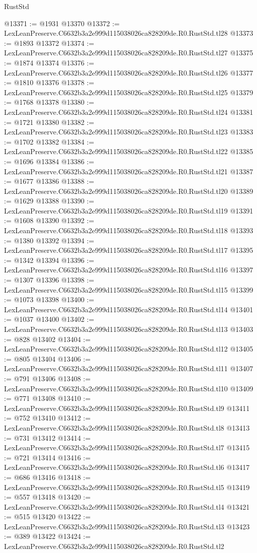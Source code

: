\begin{lexlean}{RustStd}
\begin{coremodule}
@13371 := @1931 @13370
@13372 := LexLeanPreserve.C6632b3a2e999d115038026ca828209de.R0.RustStd.tl28
@13373 := @1893 @13372
@13374 := LexLeanPreserve.C6632b3a2e999d115038026ca828209de.R0.RustStd.tl27
@13375 := @1874 @13374
@13376 := LexLeanPreserve.C6632b3a2e999d115038026ca828209de.R0.RustStd.tl26
@13377 := @1810 @13376
@13378 := LexLeanPreserve.C6632b3a2e999d115038026ca828209de.R0.RustStd.tl25
@13379 := @1768 @13378
@13380 := LexLeanPreserve.C6632b3a2e999d115038026ca828209de.R0.RustStd.tl24
@13381 := @1721 @13380
@13382 := LexLeanPreserve.C6632b3a2e999d115038026ca828209de.R0.RustStd.tl23
@13383 := @1702 @13382
@13384 := LexLeanPreserve.C6632b3a2e999d115038026ca828209de.R0.RustStd.tl22
@13385 := @1696 @13384
@13386 := LexLeanPreserve.C6632b3a2e999d115038026ca828209de.R0.RustStd.tl21
@13387 := @1677 @13386
@13388 := LexLeanPreserve.C6632b3a2e999d115038026ca828209de.R0.RustStd.tl20
@13389 := @1629 @13388
@13390 := LexLeanPreserve.C6632b3a2e999d115038026ca828209de.R0.RustStd.tl19
@13391 := @1608 @13390
@13392 := LexLeanPreserve.C6632b3a2e999d115038026ca828209de.R0.RustStd.tl18
@13393 := @1380 @13392
@13394 := LexLeanPreserve.C6632b3a2e999d115038026ca828209de.R0.RustStd.tl17
@13395 := @1342 @13394
@13396 := LexLeanPreserve.C6632b3a2e999d115038026ca828209de.R0.RustStd.tl16
@13397 := @1307 @13396
@13398 := LexLeanPreserve.C6632b3a2e999d115038026ca828209de.R0.RustStd.tl15
@13399 := @1073 @13398
@13400 := LexLeanPreserve.C6632b3a2e999d115038026ca828209de.R0.RustStd.tl14
@13401 := @1037 @13400
@13402 := LexLeanPreserve.C6632b3a2e999d115038026ca828209de.R0.RustStd.tl13
@13403 := @828 @13402
@13404 := LexLeanPreserve.C6632b3a2e999d115038026ca828209de.R0.RustStd.tl12
@13405 := @805 @13404
@13406 := LexLeanPreserve.C6632b3a2e999d115038026ca828209de.R0.RustStd.tl11
@13407 := @791 @13406
@13408 := LexLeanPreserve.C6632b3a2e999d115038026ca828209de.R0.RustStd.tl10
@13409 := @771 @13408
@13410 := LexLeanPreserve.C6632b3a2e999d115038026ca828209de.R0.RustStd.tl9
@13411 := @752 @13410
@13412 := LexLeanPreserve.C6632b3a2e999d115038026ca828209de.R0.RustStd.tl8
@13413 := @731 @13412
@13414 := LexLeanPreserve.C6632b3a2e999d115038026ca828209de.R0.RustStd.tl7
@13415 := @721 @13414
@13416 := LexLeanPreserve.C6632b3a2e999d115038026ca828209de.R0.RustStd.tl6
@13417 := @686 @13416
@13418 := LexLeanPreserve.C6632b3a2e999d115038026ca828209de.R0.RustStd.tl5
@13419 := @557 @13418
@13420 := LexLeanPreserve.C6632b3a2e999d115038026ca828209de.R0.RustStd.tl4
@13421 := @515 @13420
@13422 := LexLeanPreserve.C6632b3a2e999d115038026ca828209de.R0.RustStd.tl3
@13423 := @389 @13422
@13424 := LexLeanPreserve.C6632b3a2e999d115038026ca828209de.R0.RustStd.tl2

\end{coremodule}
\end{lexlean}
